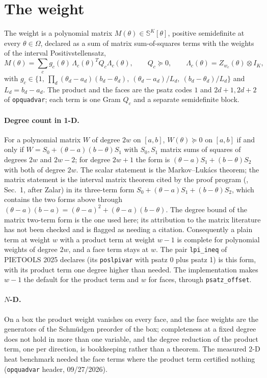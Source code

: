 \documentclass[12pt]{article}
\newcommand{\code}[1]{\texttt{#1}}
\newcommand{\file}[1]{\path{#1}}      %
\theoremstyle{plain}
\theoremstyle{definition}
\theoremstyle{remark}
\begin{document}
\section{The weight}\label{sec:weight}

The weight is a polynomial matrix $M(\theta)\in\mathbb S^{K}[\theta]$, positive semidefinite at every $\theta\in\Omega$, declared as a sum of matrix sum-of-squares terms with the weights of the interval Positivstellensatz,
\begin{equation}\label{eq:weight}
M(\theta)=\sum_{c}g_c(\theta)\,\Lambda_c(\theta)^TQ_c\Lambda_c(\theta),\qquad Q_c\succeq0,\qquad \Lambda_c(\theta)=Z_{w_c}(\theta)\otimes I_K,
\end{equation}
with $g_c\in\{1,\ \prod_d(\theta_d-a_d)(b_d-\theta_d),\ (\theta_d-a_d)/L_d,\ (b_d-\theta_d)/L_d\}$ and $L_d=b_d-a_d$. The product and the faces are the psatz codes $1$ and $2d+1,2d+2$ of \code{opquadvar}; each term is one Gram $Q_c$ and a separate semidefinite block.

\paragraph{Degree count in 1-D.} For a polynomial matrix $W$ of degree $2w$ on $[a,b]$, $W(\theta)\succeq0$ on $[a,b]$ if and only if $W=S_0+(\theta-a)(b-\theta)S_1$ with $S_0,S_1$ matrix sums of squares of degrees $2w$ and $2w-2$; for degree $2w+1$ the form is $(\theta-a)S_1+(b-\theta)S_2$ with both of degree $2w$. The scalar statement is the Markov--Luk\'acs theorem; the matrix statement is the interval matrix theorem cited by the proof program (\file{relevant_positivstellensatz.md}, Sec.~1, after Zalar) in its three-term form $S_0+(\theta-a)S_1+(b-\theta)S_2$, which contains the two forms above through $(\theta-a)(b-a)=(\theta-a)^2+(\theta-a)(b-\theta)$. The degree bound of the matrix two-term form is the one used here; its attribution to the matrix literature has not been checked and is flagged as needing a citation. Consequently a plain term at weight $w$ with a product term at weight $w-1$ is complete for polynomial weights of degree $2w$, and a face term stays at $w$. The pair \code{lpi\_ineq} of PIETOOLS 2025 declares (its \code{poslpivar} with psatz 0 plus psatz 1) is this form, with its product term one degree higher than needed. The implementation makes $w-1$ the default for the product term and $w$ for faces, through \code{psatz\_offset}.

\paragraph{$N$-D.} On a box the product weight vanishes on every face, and the face weights are the generators of the Schm\"udgen preorder of the box; completeness at a fixed degree does not hold in more than one variable, and the degree reduction of the product term, one per direction, is bookkeeping rather than a theorem. The measured 2-D heat benchmark needed the face terms where the product term certified nothing (\code{opquadvar} header, 09/27/2026).
\end{document}

